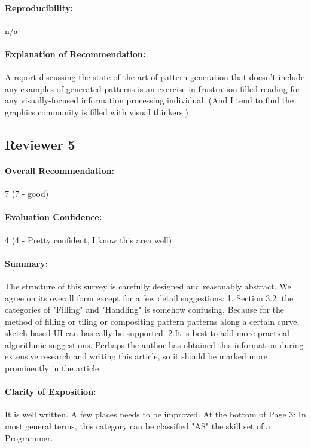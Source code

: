 \documentclass{egpubl}
\newcommand{\rev}[2]{{\color{greenrev}\textsuperscript{#1}#2}}
\renewcommand{\rev}[2]{{#2}}
\begin{document}
\paragraph*{Reproducibility:} n/a


\paragraph*{Explanation of Recommendation:} A report discussing the state of the art of pattern generation that doesn't include any examples of generated patterns is an exercise in frustration-filled reading for any visually-focused information processing individual. (And I tend to find the graphics community is filled with visual thinkers.)


\rev{Comments}{}


\subsection*{Reviewer 5} 

\paragraph*{Overall Recommendation:} 7 (7 - good)
\paragraph*{Evaluation Confidence:} 4 (4 - Pretty confident, I know this area well)
\paragraph*{Summary:} The structure of this survey is carefully designed and reasonably abstract. We agree on its overall form except for a few detail suggestions:
1. Section 3.2, the categories of "Filling" and "Handling" is somehow confusing, Because for the method of filling or tiling or compositing pattern patterns along a certain curve, sketch-based UI can basically be supported.
2.It is best to add more practical algorithmic suggestions. Perhaps the author has obtained this information during extensive research and writing this article, so it should be marked more prominently in the article.
\paragraph*{Clarity of Exposition:} It is well written.  A few places needs to be improved.
At the bottom of Page 3:  In most general terms, this category can be classified  "AS" the skill set of a Programmer.
\end{document}
